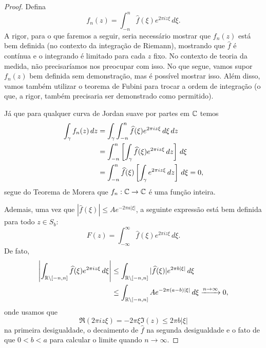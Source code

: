         \begin{proof}
            Defina
            \begin{equation*}
                f_n(z) = \int_{-n}^{n} \widehat{f}(\xi) e^{2\pi iz\xi} \, d\xi.
            \end{equation*}
            A rigor, para o que faremos a seguir, seria necessário mostrar que $f_n(z)$ está bem
            definida (no contexto da integração de Riemann), mostrando que $\widehat{f}$ é contínua
            e o integrando é limitado para cada $z$ fixo. No contexto de teoria da medida, 
            não precisaríamos nos preocupar com isso. No que segue, vamos supor $f_n(z)$ bem 
            definida sem demonstração, mas é possível mostrar isso. Além disso, vamos
            também utilizar o teorema de Fubini para trocar a ordem de integração 
            (o que, a rigor, também precisaria ser demonstrado como permitido).
            
            Já que para qualquer curva de Jordan suave por partes em $\mathbb{C}$ temos
            \begin{align*}
                \int_{\gamma} f_n(z) \, dz &= \int_{\gamma} \int_{-n}^n \widehat{f}(\xi) e^{2\pi iz\xi} \, d\xi \, dz \\
                                       &= \int_{-n}^n \left[ \int_{\gamma} \widehat{f}(\xi)e^{2\pi iz\xi} \, dz 
                                        \right] \, d\xi \\
                                       &= \int_{-n}^n \widehat{f}(\xi) \left[ \int_{\gamma} e^{2\pi iz\xi} \, dz
                                       \right] \, d\xi = 0,
            \end{align*}
            segue do Teorema de Morera que $f_n:\mathbb{C}\to\mathbb{C}$ é uma função inteira.
            
            Ademais, uma vez que $|\widehat{f}(\xi)| \leq Ae^{-2\pi a|\xi|}$, a seguinte expressão 
            está bem definida para todo $z\in S_b$:
            \begin{equation*}
                F(z) = \int_{-\infty}^{\infty} \widehat{f}(\xi) e^{2\pi iz\xi} \, d\xi.
            \end{equation*}
            De fato,
            \begin{align*}
                \left| \int_{\mathbb{R}\setminus [-n,n]} \widehat{f}(\xi) e^{2\pi iz\xi} \, d\xi \right|
                &\leq \int_{\mathbb{R}\setminus [-n,n]} |\widehat{f}(\xi)|e^{2\pi b|\xi|} \, d\xi \\
                &\leq \int_{\mathbb{R}\setminus [-n,n]} Ae^{-2\pi (a-b)|\xi|} \, d\xi \xrightarrow{n\to\infty} 0,
            \end{align*}
            onde usamos que
            \begin{equation*}
                \Re(2\pi iz\xi) = -2\pi\xi\Im(z) \leq 2\pi b|\xi|
            \end{equation*}
            na primeira desigualdade, o decaimento de $\widehat{f}$ na segunda desigualdade e
            o fato de que $0<b<a$ para calcular o limite quando $n\to\infty$.
            

\end{proof}
